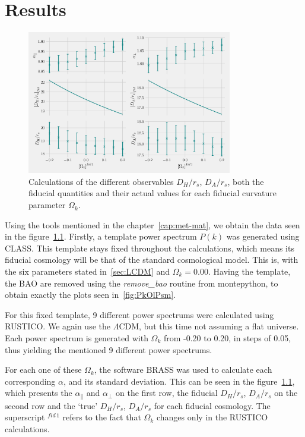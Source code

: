 \chapter{Results}

\begin{figure}[b]
	\centering
	\includegraphics[width=0.8\textwidth]{../figs/phase2_DA_DH_flat.pdf}
	\caption{Calculations of the different observables $D_H /r_s$, $D_A /r_s$, both the fiducial quantities and their actual values for each fiducial curvature parameter $\Omega_k$.}
	\label{fig:DA_DH}
\end{figure}

Using the tools mentioned in the chapter~\ref{cap:met-mat}, we obtain the data seen in the figure~\ref{fig:DA_DH}. Firstly, a template power spectrum $P(k)$ was generated using CLASS. This template stays fixed throughout the calculations, which means its fiducial cosmology will be that of the standard cosmological model. This is, with the six parameters stated in~\ref{sec:LCDM} and $\Omega_k=0.00$. Having the template, the BAO are removed using the \textit{remove\_bao} routine from montepython, to obtain exactly the plots seen in~\ref{fig:PkOlPsm}.

For this fixed template, 9 different power spectrums were calculated using RUSTICO\@. We again use the $\Lambda$CDM, but this time not assuming a flat universe. Each power spectrum is generated with $\Omega_k$ from -0.20 to 0.20, in steps of 0.05, thus yielding the mentioned 9 different power spectrums.

For each one of these $\Omega_k$, the software BRASS was used to calculate each corresponding $\alpha$, and its standard deviation. This can be seen in the figure~\ref{fig:DA_DH}, which presents the $\alpha_\parallel$ and $\alpha_\perp$ on the first row, the fiducial $D_H / r_s$, $D_A/r_s $ on the second row and the `true' $D_H / r_s$, $D_A /r_s$ for each fiducial cosmology. The superscript $^{fid\, 1}$ refers to the fact that $\Omega_k$ changes only in the RUSTICO calculations. 

